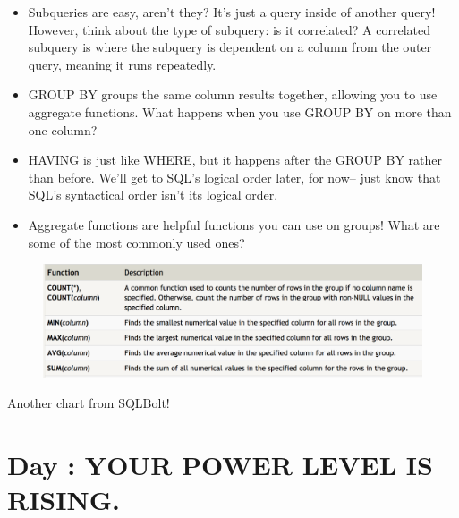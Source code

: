 \documentclass{42-en}
\begin{document}
	\begin{itemize}\itemsep1pt 
		\item Subqueries are easy, aren't they? It's just a query inside of another query! 
			However, think about the type of subquery: is it correlated? A correlated 
			subquery is where the subquery is dependent on a column from the outer query, 
			meaning it runs repeatedly. 
		\item GROUP BY groups the same column results together, allowing you to use aggregate functions. 
			What happens when you use GROUP BY on more than one column? 
		\item HAVING is just like WHERE, but it happens after the GROUP BY rather than before. 
			We'll get to SQL's logical order 
			later, for now-- just know that SQL's syntactical order isn't its logical order. 
		\item Aggregate functions are helpful functions you can use on groups! What are some of the most 
			commonly used ones?
	\end{itemize}

            \begin{figure}[H]
                \begin{center}
                    \includegraphics[width=14cm]{aggregate_functions.png}
                \end{center}
            \end{figure}

	   Another chart from SQLBolt!

\nextexercice


\chapter{Day \exercicenumber: YOUR POWER LEVEL IS RISING. }
\end{document}
